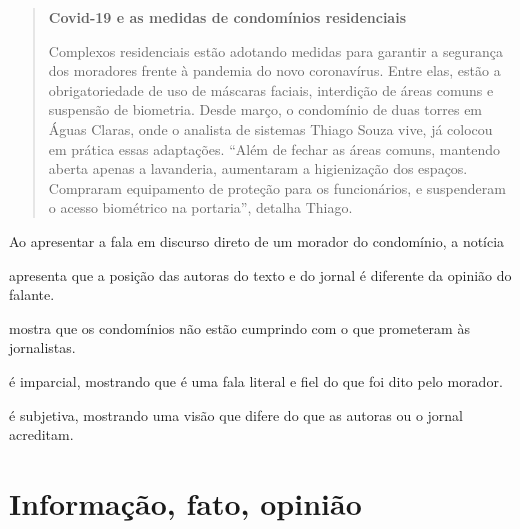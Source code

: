 \begin{quote}
\textbf{Covid-19 e as medidas de condomínios residenciais}


Complexos residenciais estão adotando medidas para garantir a segurança
dos moradores frente à pandemia do novo coronavírus. Entre elas, estão a
obrigatoriedade de uso de máscaras faciais, interdição de áreas comuns e
suspensão de biometria. Desde março, o condomínio de duas torres em
Águas Claras, onde o analista de sistemas Thiago Souza vive, já colocou
em prática essas adaptações. ``Além de fechar as áreas comuns, mantendo
aberta apenas a lavanderia, aumentaram a higienização dos espaços.
Compraram equipamento de proteção para os funcionários, e suspenderam o
acesso biométrico na portaria'', detalha Thiago.

\end{quote}

Ao apresentar a fala em discurso direto de um morador do condomínio, a
notícia

\begin{escolha}
\item apresenta que a posição das autoras do texto e do jornal é diferente
da opinião do falante.

\item mostra que os condomínios não estão cumprindo com o que prometeram
às jornalistas.

\item é imparcial, mostrando que é uma fala literal e fiel do que foi dito
pelo morador.

\item é subjetiva, mostrando uma visão que difere do que as autoras ou o
jornal acreditam.
\end{escolha}

\chapter{Informação, fato, opinião}

